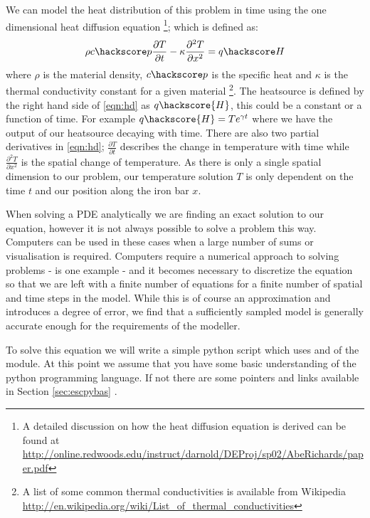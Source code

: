 We can model the heat distribution of this problem in time using the one dimensional heat diffusion equation
\footnote{A detailed discussion on how the heat diffusion equation is derived can be found at \url{http://online.redwoods.edu/instruct/darnold/DEProj/sp02/AbeRichards/paper.pdf}};
which is defined as:
\begin{equation}
\rho c\hackscore p \frac{\partial T}{\partial t} - \kappa \frac{\partial^{2} T}{\partial x^{2}} = q\hackscore H 
\label{eqn:hd}
\end{equation}
where $\rho$ is the material density, $c\hackscore p$ is the specific heat and $\kappa$ is the thermal conductivity constant for a given material
\footnote{A list of some common thermal conductivities is available from Wikipedia \url{http://en.wikipedia.org/wiki/List_of_thermal_conductivities}}. 
The heatsource is defined by the right hand side of \eqref{eqn:hd} as $q\hackscore{H}$, this could be a constant or a function of time. For example $q\hackscore{H} = Te^{\gamma t}$ where we have the output of our heatsource decaying with time. There are also two partial derivatives in \eqref{eqn:hd}; $\frac{\partial T}{\partial t}$ describes the change in temperature with time while $\frac{\partial ^2 T}{\partial x^2}$ is the spatial change of temperature. As there is only a single spatial dimension to our problem, our temperature solution $T$ is only dependent on the time $t$ and our position along the iron bar $x$.

When solving a PDE analytically we are finding an exact solution to our equation, however it is not always possible to solve a problem this way. Computers can be used in these cases when a large number of sums or visualisation is required. Computers require a numerical approach to solving problems - \ESCRIPT is one example -  and it becomes necessary to discretize the equation so that we are left with a finite number of equations for a finite number of spatial and time steps in the model. While this is of course an approximation and introduces a degree of error, we find that a sufficiently sampled model is generally accurate enough for the requirements of the modeller.

To solve this equation we will write a simple python script which uses \ESCRIPT and \FINLEY of the \ESYS module. At this point we assume that you have some basic understanding of the python programming language. If not there are some pointers and links available in Section \ref{sec:escpybas} .

